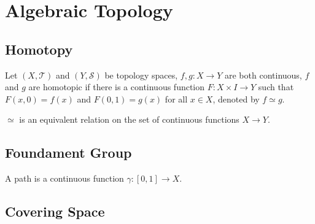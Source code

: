 \section{Algebraic Topology}

\subsection{Homotopy}
\begin{defi}
Let $(X, \mathcal{T})$ and $(Y, \mathcal{S})$ be topology spaces,
$f, g : X \to Y$ are both continuous,
$f$ and $g$ are homotopic if there is a continuous function
$F : X \times I \to Y$ such that $F(x, 0) = f(x)$
and $F(0, 1) = g(x)$ for all $x \in X$, denoted by $f \simeq g$.
\end{defi}

\begin{pro}
$\simeq$ is an equivalent relation on the set of continuous functions $X \to Y$.
\end{pro}


\subsection{Foundament Group}
 A path is a continuous function $\gamma: [0, 1] \to X$.



\subsection{Covering Space}
